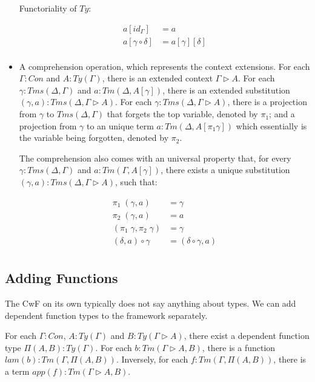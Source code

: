 \begin{itemize}
{  Functoriality of $Ty$:

  \begin{align*}
    a [id_{\Gamma}] & = a \\
    a [\gamma \circ \delta] & = a [\gamma] [\delta] \\
  \end{align*}
  }

\item{A comprehension operation, which represents the context extensions. For each $\Gamma : Con$ and $A : Ty(\Gamma)$, there is an extended context $\Gamma \triangleright A$. For each $\gamma : Tms (\Delta, \Gamma)$ and $a : Tm (\Delta, A[\gamma])$, there is an extended substitution $(\gamma, a) : Tms (\Delta, \Gamma \triangleright A)$. For each $\gamma : Tms (\Delta, \Gamma \triangleright A)$, there is a projection from $\gamma$ to $Tms (\Delta, \Gamma)$ that forgets the top variable, denoted by $\pi_1$; and a projection from $\gamma$ to an unique term $a : Tm (\Delta, A[\pi_1 \gamma])$ which essentially is the variable being forgotten, denoted by $\pi_2$.

The comprehension also comes with an universal property that, for every $\gamma : Tms (\Delta, \Gamma)$ and $a : Tm(\Gamma , A[\gamma])$, there exists a unique substitution $(\gamma, a) : Tms (\Delta, \Gamma \triangleright A)$, such that:

  \begin{align*}
    \pi_1\;(\gamma, a) & = \gamma \\
    \pi_2\;(\gamma, a) & = a \\
    (\pi_1\;\gamma , \pi_2\;\gamma) & = \gamma \\
    (\delta, a) \circ \gamma & = (\delta \circ \gamma , a) \\
  \end{align*}
  }
  
\end{itemize}

\subsection{Adding Functions}

The CwF on its own typically does not say anything about types. We can add dependent function types to the framework separately.

For each $\Gamma : Con$, $A : Ty(\Gamma)$ and $B : Ty(\Gamma \triangleright A)$, there exist a dependent function type $\Pi (A, B) : Ty(\Gamma)$. For each $b : Tm(\Gamma \triangleright A, B)$, there is a function $lam(b) : Tm (\Gamma, \Pi (A, B))$. Inversely, for each $f : Tm(\Gamma, \Pi (A, B))$, there is a term $app(f) : Tm(\Gamma \triangleright A, B)$.

